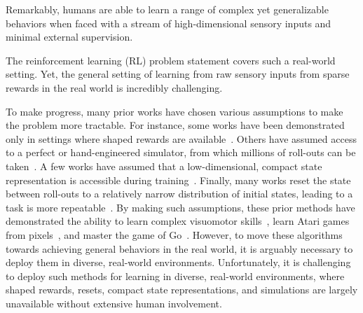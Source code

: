 

Remarkably, humans are able to learn a range of complex yet generalizable behaviors when faced with a stream of high-dimensional sensory inputs and minimal external supervision. 

The reinforcement learning (RL) problem statement covers such a real-world setting. Yet, the general setting of learning from raw sensory inputs from sparse rewards in the real world is incredibly challenging. 

To make progress, many prior works have chosen various assumptions to make the problem more tractable. For instance, some works have been demonstrated only in settings where shaped rewards are available~\cite{todo}.
Others have assumed access to a perfect or hand-engineered simulator, from which millions of roll-outs can be taken~\cite{atari,openai_hand}.
A few works have assumed that a low-dimensional, compact state representation is accessible during training~\cite{e2e,asymmetric_ac}. Finally, many works reset the state between roll-outs to a relatively narrow distribution of initial states, leading to a task is more repeatable~\cite{atari,dsae,gps,etc}.
By making such assumptions, these prior methods have demonstrated the ability to learn complex visuomotor skills~\cite{e2e}, learn Atari games from pixels~\cite{atari}, and master the game of Go~\cite{alphago}.
However, to move these algorithms towards achieving general behaviors in the real world, it is arguably necessary to deploy them in diverse, real-world environments.
Unfortunately, it is challenging to deploy such methods for learning in diverse, real-world environments, where shaped rewards, resets, compact state representations, and simulations are largely unavailable without extensive human involvement.

